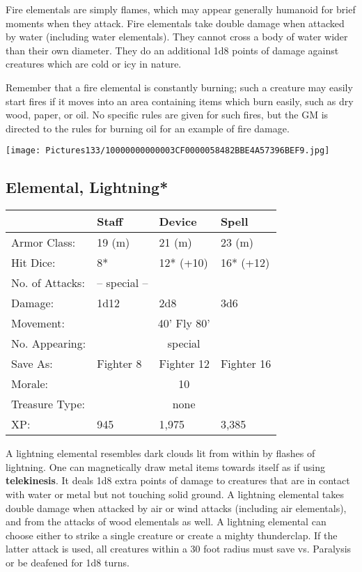 \documentclass[a4paper,twoside,openany,10pt]{book}
\begin{document}
\begin{multicols}{2}
Fire elementals are simply flames, which may appear generally humanoid for brief moments when they attack. Fire elementals take double damage when attacked by water (including water elementals). They cannot cross a body of water wider than their own diameter. They do an additional 1d8 points of damage against creatures which are cold or icy in nature.

Remember that a fire elemental is constantly burning; such a creature may easily start fires if it moves into an area containing items which burn easily, such as dry wood, paper, or oil. No specific rules are given for such fires, but the GM is directed to the rules for burning oil for an example of fire damage.

\begin{center}
	\texttt{[image: Pictures133/10000000000003CF0000058482BBE4A57396BEF9.jpg]}
\end{center}

\subsection*{Elemental, Lightning*}\label{elemental-lightning}

\begin{tabularx}{0.48\textwidth}{@{}lllX@{}}
& Staff & Device & Spell \\\hline
Armor Class: & 19 (m) & 21 (m) & 23 (m) \\\hline
Hit Dice: & 8* & 12* (+10) & 16* (+12) \\\hline
No. of Attacks: & -- special -- & & \\\hline
Damage: & 1d12 & 2d8 & 3d6 \\\hline
Movement:  & \multicolumn{3}{c}{40' Fly 80'}\\\hline 
No. Appearing: &\multicolumn{3}{c}{special} \\\hline
Save As: & Fighter 8 & Fighter 12 & Fighter 16 \\\hline
Morale: & \multicolumn{3}{c}{10} \\\hline
Treasure Type: & \multicolumn{3}{c}{none} \\\hline
XP: & 945 & 1,975 & 3,385 \\\hline
\end{tabularx}\medskip

A lightning elemental resembles dark clouds lit from within by flashes of lightning. One can magnetically draw metal items towards itself as if using \textbf{telekinesis}. It deals 1d8 extra points of damage to creatures that are in contact with water or metal but not touching solid ground. A lightning elemental takes double damage when attacked by air or wind attacks (including air elementals), and from the attacks of wood elementals as well. A lightning elemental can choose either to strike a single creature or create a mighty thunderclap. If the latter attack is used, all creatures within a 30 foot radius must save vs. Paralysis or be deafened for 1d8 turns.



\end{multicols}
\end{document}
